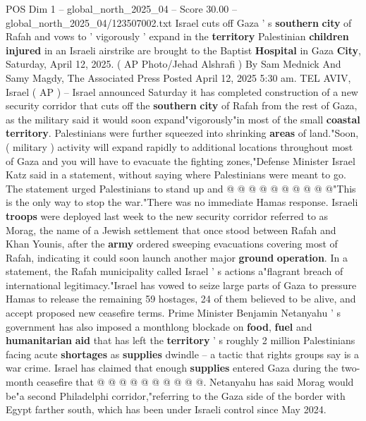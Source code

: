 \begin{textsample}{POS Dim 1 – global\_north\_2025\_04 – Score 30.00 – global\_north\_2025\_04/123507002.txt}  \label{ex:f1_pos_348}
Israel cuts off Gaza ' s \textbf{southern} \textbf{city} of Rafah and vows to ' vigorously ' expand in the \textbf{territory} Palestinian \textbf{children} \textbf{injured} in an Israeli airstrike are brought to the Baptist \textbf{Hospital} in Gaza \textbf{City}, Saturday, April 12, 2025. ( AP Photo/Jehad Alshrafi ) By Sam Mednick And Samy Magdy, The Associated Press Posted April 12, 2025 5:30 am.
TEL AVIV, Israel ( AP ) -- Israel announced Saturday it has completed construction of a new security corridor that cuts off the \textbf{southern} \textbf{city} of Rafah from the rest of Gaza, as the military said it would soon expand"vigorously"in most of the small \textbf{coastal} \textbf{territory}.
Palestinians were further squeezed into shrinking \textbf{areas} of land."Soon, ( military ) activity will expand rapidly to additional locations throughout most of Gaza and you will have to evacuate the fighting zones,"Defense Minister Israel Katz said in a statement, without saying where Palestinians were meant to go.
The statement urged Palestinians to stand up and @ @ @ @ @ @ @ @ @ @"This is the only way to stop the war."There was no immediate Hamas response.
Israeli \textbf{troops} were deployed last week to the new security corridor referred to as Morag, the name of a Jewish settlement that once stood between Rafah and Khan Younis, after the \textbf{army} ordered sweeping evacuations covering most of Rafah, indicating it could soon launch another major \textbf{ground} \textbf{operation}.
In a statement, the Rafah municipality called Israel ' s actions a"flagrant breach of international legitimacy."Israel has vowed to seize large parts of Gaza to pressure Hamas to release the remaining 59 hostages, 24 of them believed to be alive, and accept proposed new ceasefire terms.
Prime Minister Benjamin Netanyahu ' s government has also imposed a monthlong blockade on \textbf{food}, \textbf{fuel} and \textbf{humanitarian} \textbf{aid} that has left the \textbf{territory} ' s roughly 2 million Palestinians facing acute \textbf{shortages} as \textbf{supplies} dwindle -- a tactic that rights groups say is a war crime.
Israel has claimed that enough \textbf{supplies} entered Gaza during the two-month ceasefire that @ @ @ @ @ @ @ @ @ @.
Netanyahu has said Morag would be"a second Philadelphi corridor,"referring to the Gaza side of the border with Egypt farther south, which has been under Israeli control since May 2024.

\end{textsample}
